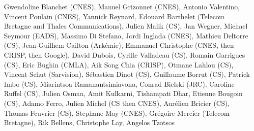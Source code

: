 Gwendoline Blanchet (CNES), Manuel Grizonnet (CNES), Antonio Valentino, Vincent Poulain (CNES), Yannick Reynard, Edouard Barthelet (Telecom Bretagne and Thales Communications), Julien Malik (CS), Jan Wegner, Michael Seymour (EADS), Massimo Di Stefano, Jordi Inglada (CNES), Mathieu Deltorre (CS), Jean-Guilhem Cailton (Ark\'emie), Emmanuel Christophe (CNES, then CRISP, then Google), David Dubois, Cyrille Valladeau (CS), Romain Garrigues (CS), Eric Bughin (CMLA), Aik Song Chia (CRISP), Otmane Lahlou (CS), Vincent Schut (Sarvision), S\'ebastien Dinot (CS), Guillaume Borrut (CS), Patrick Imbo (CS), Miarintsoa Ramanantsimiavona, Conrad Bielski (JRC), Caroline Ruffel (CS), Julien Osman, Amit Kulkarni, Tishampati Dhar, Etienne Bougoin (CS), Adamo Ferro, Julien Michel (CS then CNES), Aur\'elien Bricier (CS), Thomas Feuvrier (CS), Stephane May (CNES), Gr\'egoire Mercier (Telecom Bretagne), Rik Bellens, Christophe Lay, Angelos Tzotsos